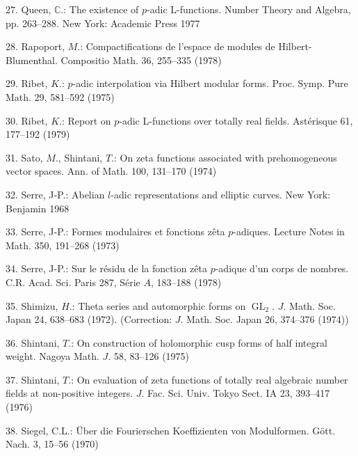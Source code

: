 \documentclass[11pt]{article}
\begin{document}
\par
27. Queen, \(\mathbb{C}\).: The existence of \(p\)-adic L-functions. Number Theory and Algebra, pp. 263--288. New York: Academic Press 1977\par
\par
28. Rapoport, \(M\).: Compactifications de l’espace de modules de Hilbert-Blumenthal. Compositio Math. 36, 255--335 (1978)\par
\par
29. Ribet, \(K\).: \(p\)-adic interpolation via Hilbert modular forms. Proc. Symp. Pure Math. 29, 581--592 (1975)\par
\par
30. Ribet, \(K\).: Report on \(p\)-adic L-functions over totally real fields. Astérisque 61, 177--192 (1979)\par
\par
31. Sato, \(M\)., Shintani, \(T\).: On zeta functions associated with prehomogeneous vector spaces. Ann. of Math. 100, 131--170 (1974)\par
\par
32. Serre, J-P.: Abelian \(l\)-adic representations and elliptic curves. New York: Benjamin 1968\par
\par
33. Serre, J-P.: Formes modulaires et fonctions zêta \(p\)-adiques. Lecture Notes in Math. 350, 191--268 (1973)\par
\par
34. Serre, J-P.: Sur le résidu de la fonction zêta \(p\)-adique d’un corps de nombres. C.R. Acad. Sci. Paris 287, Série \(A\), 183--188 (1978)\par
\par
35. Shimizu, \(H\).: Theta series and automorphic forms on \(\operatorname{GL}_{2}\). \(J\). Math. Soc. Japan 24, 638--683 (1972). (Correction: \(J\). Math. Soc. Japan 26, 374--376 (1974))\par
\par
36. Shintani, \(T\).: On construction of holomorphic cusp forms of half integral weight. Nagoya Math. \(J\). 58, 83--126 (1975)\par
\par
37. Shintani, \(T\).: On evaluation of zeta functions of totally real algebraic number fields at non-positive integers. \(J\). Fac. Sci. Univ. Tokyo Sect. IA 23, 393--417 (1976)\par
\par
38. Siegel, C.L.: Über die Fourierschen Koeffizienten von Modulformen. Gött. Nach. 3, 15--56 (1970)\par
\end{document}

